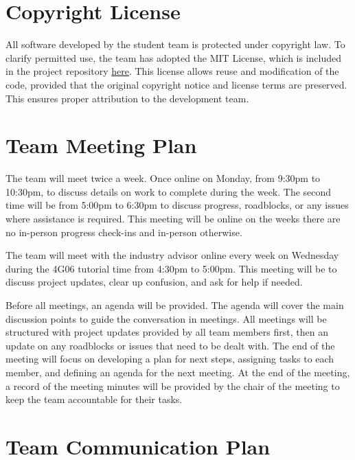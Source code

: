 \documentclass{article}
\begin{document}
\section{Copyright License}

All software developed by the student team is protected under copyright law. 
To clarify permitted use, the team has adopted the MIT License, which is included 
in the project repository
\href{https://github.com/4G06-Streamliners/MacSync/blob/main/LICENSE}{here}. 
This license allows reuse and modification of the code, provided that the 
original copyright notice and license terms are preserved. This ensures proper 
attribution to the development team.

\section{Team Meeting Plan}
The team will meet twice a week. Once online on Monday, from 9:30pm to 10:30pm, to discuss details on work to complete during the week. The second time will be from 5:00pm to 6:30pm to discuss progress, roadblocks, or any issues where assistance is required. This meeting will be online on the weeks there are no in-person progress check-ins and in-person otherwise. \vspace{1em}

The team will meet with the industry advisor online every week on Wednesday during the 4G06 tutorial time from 4:30pm to 5:00pm. This meeting will be to discuss project updates, clear up confusion, and ask for help if needed. \vspace{1em}

Before all meetings, an agenda will be provided. The agenda will cover the main discussion points to guide the conversation in meetings. All meetings will be structured with project updates provided by all team members first, then an update on any roadblocks or issues that need to be dealt with. The end of the meeting will focus on developing a plan for next steps, assigning tasks to each member, and defining an agenda for the next meeting. At the end of the meeting, a record of the meeting minutes will be provided by the chair of the meeting to keep the team accountable for their tasks.





\section{Team Communication Plan}
\end{document}
